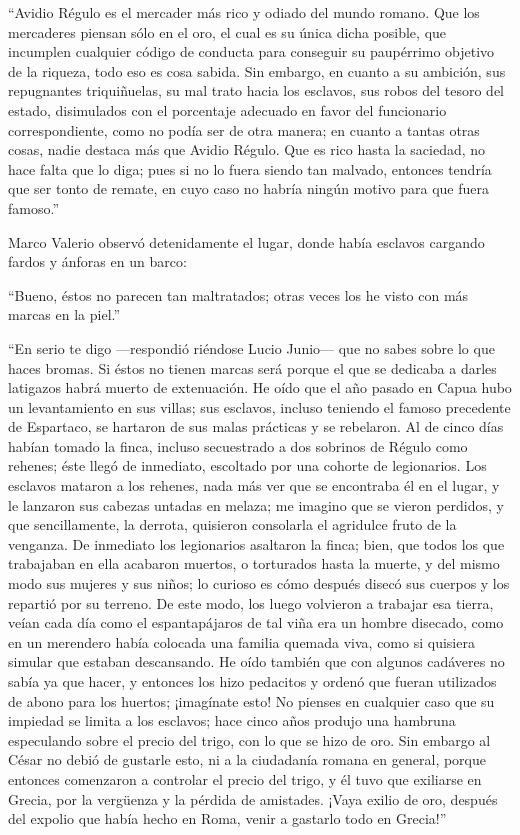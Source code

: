 \documentclass[11pt,openany]{book}
\begin{document}
“Avidio Régulo es el mercader más rico y odiado del mundo romano. Que los mercaderes piensan sólo en el oro, el cual es su única dicha posible, que incumplen cualquier código de conducta para conseguir su paupérrimo objetivo de la riqueza, todo eso es cosa sabida. Sin embargo, en cuanto a su ambición, sus repugnantes triquiñuelas, su mal trato hacia los esclavos, sus robos del tesoro del estado, disimulados con el porcentaje adecuado en favor del funcionario correspondiente, como no podía ser de otra manera; en cuanto a tantas otras cosas, nadie destaca más que Avidio Régulo. Que es rico hasta la saciedad, no hace falta que lo diga; pues si no lo fuera siendo tan malvado, entonces tendría que ser tonto de remate, en cuyo caso no habría ningún motivo para que fuera famoso.” 

Marco Valerio observó detenidamente el lugar, donde había esclavos cargando fardos y ánforas en un barco: 

“Bueno, éstos no parecen tan maltratados; otras veces los he visto con más marcas en la piel.” 

“En serio te digo —respondió riéndose Lucio Junio— que no sabes sobre lo que haces bromas. Si éstos no tienen marcas será porque el que se dedicaba a darles latigazos habrá muerto de extenuación. He oído que el año pasado en Capua hubo un levantamiento en sus villas; sus esclavos, incluso teniendo el famoso precedente de Espartaco, se hartaron de sus malas prácticas y se rebelaron. Al de cinco días habían tomado la finca, incluso secuestrado a dos sobrinos de Régulo como rehenes; éste llegó de inmediato, escoltado por una cohorte de legionarios. Los esclavos mataron a los rehenes, nada más ver que se encontraba él en el lugar, y le lanzaron sus cabezas untadas en melaza; me imagino que se vieron perdidos, y que sencillamente, la derrota, quisieron consolarla el agridulce fruto de la venganza. De inmediato los legionarios asaltaron la finca; bien, que todos los que trabajaban en ella acabaron muertos, o torturados hasta la muerte, y del mismo modo sus mujeres y sus niños; lo curioso es cómo después disecó sus cuerpos y los repartió por su terreno. De este modo, los luego volvieron a trabajar esa tierra, veían cada día como el espantapájaros de tal viña era un hombre disecado, como en un merendero había colocada una familia quemada viva, como si quisiera simular que estaban descansando. He oído también que con algunos cadáveres no sabía ya que hacer, y entonces los hizo pedacitos y ordenó que fueran utilizados de abono para los huertos; ¡imagínate esto! No pienses en cualquier caso que su impiedad se limita a los esclavos; hace cinco años produjo una hambruna especulando sobre el precio del trigo, con lo que se hizo de oro. Sin embargo al César no debió de gustarle esto, ni a la ciudadanía romana en general, porque entonces comenzaron a controlar el precio del trigo, y él tuvo que exiliarse en Grecia, por la vergüenza y la pérdida de amistades. ¡Vaya exilio de oro, después del expolio que había hecho en Roma, venir a gastarlo todo en Grecia!” 
\end{document}
